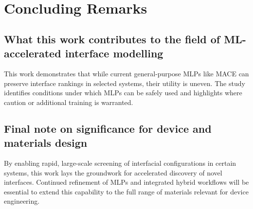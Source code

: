 \section{Concluding Remarks} \label{section:concluding_remarks}

\subsection{What this work contributes to the field of ML-accelerated interface modelling}

This work demonstrates that while current general-purpose MLPs like MACE can preserve interface rankings in selected systems, their utility is uneven. The study identifies conditions under which MLPs can be safely used and highlights where caution or additional training is warranted.

\subsection{Final note on significance for device and materials design}

By enabling rapid, large-scale screening of interfacial configurations in certain systems, this work lays the groundwork for accelerated discovery of novel interfaces. Continued refinement of MLPs and integrated hybrid workflows will be essential to extend this capability to the full range of materials relevant for device engineering.

